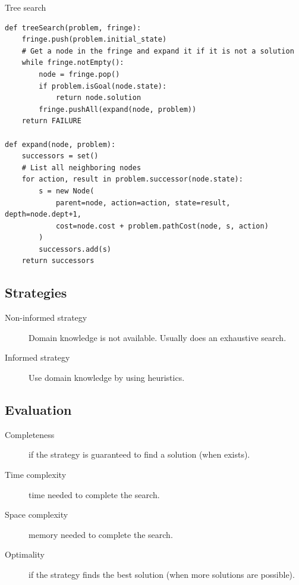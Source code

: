 \begin{algorithm}
\caption{Tree search} \label{alg:search_tree_search}
\begin{lstlisting}
def treeSearch(problem, fringe):
    fringe.push(problem.initial_state)
    # Get a node in the fringe and expand it if it is not a solution
    while fringe.notEmpty():
        node = fringe.pop()
        if problem.isGoal(node.state):
            return node.solution
        fringe.pushAll(expand(node, problem))
    return FAILURE

def expand(node, problem):
    successors = set()
    # List all neighboring nodes
    for action, result in problem.successor(node.state):
        s = new Node(
            parent=node, action=action, state=result, depth=node.dept+1,
            cost=node.cost + problem.pathCost(node, s, action)
        )
        successors.add(s)
    return successors
\end{lstlisting}
\end{algorithm}


\subsection{Strategies}
\begin{description}
    \item[Non-informed strategy] 
        Domain knowledge is not available. Usually does an exhaustive search.

    \item[Informed strategy] 
        Use domain knowledge by using heuristics.
\end{description}


\subsection{Evaluation}
\begin{description}
    \item[Completeness] 
        if the strategy is guaranteed to find a solution (when exists).

    \item[Time complexity] 
        time needed to complete the search.

    \item[Space complexity] 
        memory needed to complete the search.

    \item[Optimality] 
        if the strategy finds the best solution (when more solutions are possible).
\end{description}



